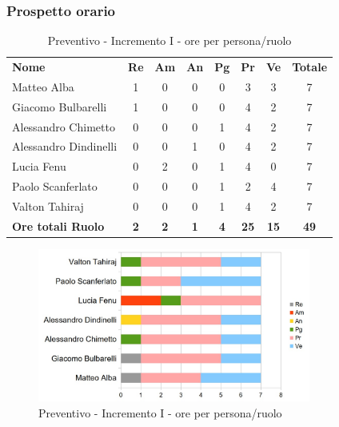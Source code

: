 \subsubsection{Prospetto orario}

	\begin{table} [h!]
	\begin{center}
		\begin{tabular} { m{3.5cm} c c c c c c c }
			\rowcolor{lightgray}
			\textbf{Nome} & \textbf{Re} & \textbf{Am} & \textbf{An} & \textbf{Pg} & \textbf{Pr} & \textbf{Ve} & \textbf{Totale} \\
			Matteo Alba & 1 & 0 & 0 & 0 & 3 & 3 & 7 \\
			Giacomo Bulbarelli & 1 & 0 & 0 & 0 & 4 & 2 & 7 \\
			Alessandro Chimetto & 0 & 0 & 0 & 1 & 4 & 2 & 7 \\
			Alessandro Dindinelli & 0 & 0 & 1 & 0 & 4 & 2 & 7 \\
			Lucia Fenu & 0 & 2 & 0 & 1 & 4 & 0 & 7 \\
			Paolo Scanferlato & 0 & 0 & 0 & 1 & 2 & 4 & 7 \\
			Valton Tahiraj & 0 & 0 & 0 & 1 & 4 & 2 & 7 \\
			\textbf{Ore totali Ruolo} & \textbf{2} & \textbf{2} & \textbf{1} & \textbf{4} & \textbf{25}& \textbf{15} & \textbf{49}
		\end{tabular}
		\caption{Preventivo - Incremento I - ore per persona/ruolo}
	\end{center}
\end{table}
	\begin{figure} [h!]
	\centering
	\includegraphics[width=0.8\textwidth]{res/img/grafici/Incremento1Ore.jpg}
	\caption{Preventivo - Incremento I - ore per persona/ruolo} 
\end{figure}

\newpage

